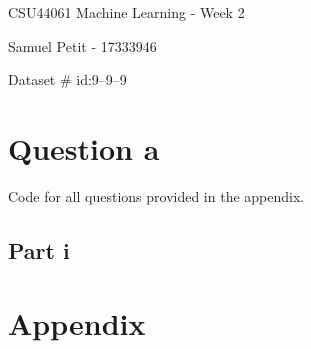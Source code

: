 \documentclass[10pt]{article}
\begin{document}
{\centering
    CSU44061 Machine Learning - Week 2
    \par
    Samuel Petit - 17333946
    \par
    Dataset \# id:9--9--9 
    \par
}
\section*{Question a}
Code for all questions provided in the appendix.

\subsection*{Part i}



\section*{Appendix}
\begin{lstlisting}[language=Python]    
\end{lstlisting}
\end{document}
